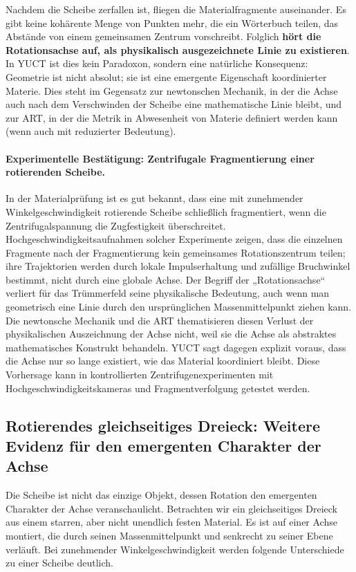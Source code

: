 \documentclass[12pt,a4paper]{article}
\begin{document}
	Nachdem die Scheibe zerfallen ist, fliegen die Materialfragmente auseinander. Es gibt keine kohärente Menge von Punkten mehr, die ein Wörterbuch teilen, das Abstände von einem gemeinsamen Zentrum vorschreibt. Folglich \textbf{hört die Rotationsachse auf, als physikalisch ausgezeichnete Linie zu existieren}. In YUCT ist dies kein Paradoxon, sondern eine natürliche Konsequenz: Geometrie ist nicht absolut; sie ist eine emergente Eigenschaft koordinierter Materie. Dies steht im Gegensatz zur newtonschen Mechanik, in der die Achse auch nach dem Verschwinden der Scheibe eine mathematische Linie bleibt, und zur ART, in der die Metrik in Abwesenheit von Materie definiert werden kann (wenn auch mit reduzierter Bedeutung).
	
	\paragraph{Experimentelle Bestätigung: Zentrifugale Fragmentierung einer rotierenden Scheibe.}
	In der Materialprüfung ist es gut bekannt, dass eine mit zunehmender Winkelgeschwindigkeit rotierende Scheibe schließlich fragmentiert, wenn die Zentrifugalspannung die Zugfestigkeit überschreitet. Hochgeschwindigkeitsaufnahmen solcher Experimente zeigen, dass die einzelnen Fragmente nach der Fragmentierung kein gemeinsames Rotationszentrum teilen; ihre Trajektorien werden durch lokale Impulserhaltung und zufällige Bruchwinkel bestimmt, nicht durch eine globale Achse. Der Begriff der „Rotationsachse“ verliert für das Trümmerfeld seine physikalische Bedeutung, auch wenn man geometrisch eine Linie durch den ursprünglichen Massenmittelpunkt ziehen kann. Die newtonsche Mechanik und die ART thematisieren diesen Verlust der physikalischen Auszeichnung der Achse nicht, weil sie die Achse als abstraktes mathematisches Konstrukt behandeln. YUCT sagt dagegen explizit voraus, dass die Achse nur so lange existiert, wie das Material koordiniert bleibt. Diese Vorhersage kann in kontrollierten Zentrifugenexperimenten mit Hochgeschwindigkeitskameras und Fragmentverfolgung getestet werden.
	
	\subsection{Rotierendes gleichseitiges Dreieck: Weitere Evidenz für den emergenten Charakter der Achse}
	
	Die Scheibe ist nicht das einzige Objekt, dessen Rotation den emergenten Charakter der Achse veranschaulicht. Betrachten wir ein gleichseitiges Dreieck aus einem starren, aber nicht unendlich festen Material. Es ist auf einer Achse montiert, die durch seinen Massenmittelpunkt und senkrecht zu seiner Ebene verläuft. Bei zunehmender Winkelgeschwindigkeit werden folgende Unterschiede zu einer Scheibe deutlich.
	
\end{document}
